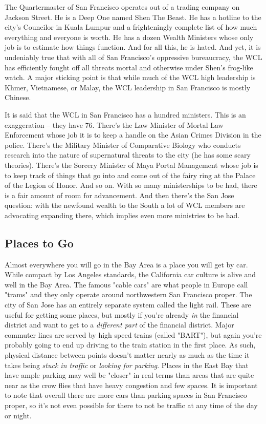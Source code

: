 The Quartermaster of San Francisco operates out of a trading company on Jackson Street. He is a Deep One named Shen The Beast. He has a hotline to the city's Councilor in Kuala Lumpur and a frighteningly complete list of how much everything and everyone is worth. He has a dozen Wealth Ministers whose only job is to estimate how things function. And for all this, he is hated. And yet, it is undeniably true that with all of San Francisco's oppressive bureaucracy, the WCL has efficiently fought off all threats mortal and otherwise under Shen's frog-like watch. A major sticking point is that while much of the WCL high leadership is Khmer, Vietnamese, or Malay, the WCL leadership in San Francisco is mostly Chinese.

It is said that the WCL in San Francisco has a hundred ministers. This is an exaggeration -- they have 76. There's the Law Minister of Mortal Law Enforcement whose job it is to keep a handle on the Asian Crimes Division in the police. There's the Military Minister of Comparative Biology who conducts research into the nature of supernatural threats to the city (he has some scary theories). There's the Sorcery Minister of Maya Portal Management whose job is to keep track of things that go into and come out of the fairy ring at the Palace of the Legion of Honor. And so on. With so many ministerships to be had, there is a fair amount of room for advancement. And then there's the San Jose question: with the newfound wealth to the South a lot of WCL members are advocating expanding there, which implies even more ministries to be had.

\subsection{Places to Go}

\hspace{\parindent} Almost everywhere you will go in the Bay Area is a place you will get by car. While compact by Los Angeles standards, the California car culture is alive and well in the Bay Area. The famous "cable cars" are what people in Europe call "trams" and they only operate around northwestern San Francisco proper. The city of San Jose has an entirely separate system called the light rail. These are useful for getting some places, but mostly if you're already \textit{in} the financial district and want to get to a \textit{different part} of the financial district. Major commuter lines are served by high speed trains (called "BART"), but again you're probably going to end up driving to the train station in the first place. As such, physical distance between points doesn't matter nearly as much as the time it takes being \textit{stuck in traffic} or \textit{looking for parking}. Places in the East Bay that have ample parking may well be "closer" in real terms than areas that are quite near as the crow flies that have heavy congestion and few spaces. It is important to note that overall there are more cars than parking spaces in San Francisco proper, so it's not even possible for there to not be traffic at any time of the day or night.

